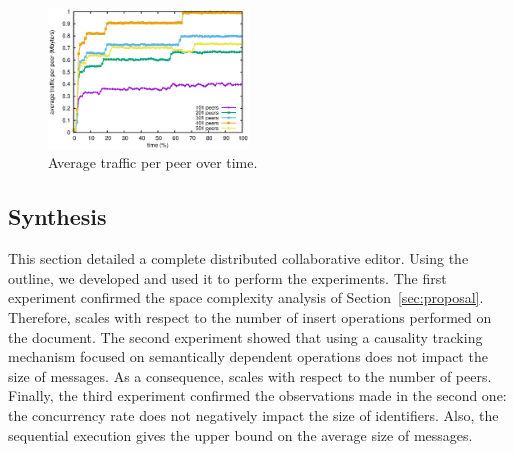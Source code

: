 \begin{figure}
  \centering
  \includegraphics[width=0.475\textwidth]{./img/traffic.eps}
  \caption{\label{fig:traffic} Average traffic per peer over time.}
\end{figure}

\subsection{Synthesis}
This section detailed a complete distributed collaborative editor.  Using the
outline, we developed \CRATE and used it to perform the experiments. The
first experiment confirmed the space complexity analysis of
Section~\ref{sec:proposal}. Therefore, \CRATE scales with respect to the
number of insert operations performed on the document. The second experiment
showed that using a causality tracking mechanism focused on semantically
dependent operations does not impact the size of messages. As a consequence,
\CRATE scales with respect to the number of peers. Finally, the third
experiment confirmed the observations made in the second one: the concurrency
rate does not negatively impact the size of identifiers. Also, the sequential
execution gives the upper bound on the average size of messages.


